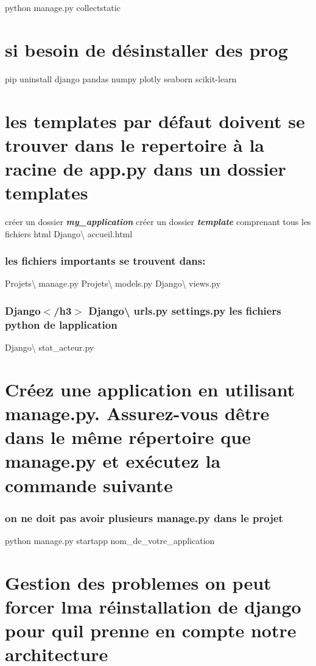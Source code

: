 python manage.\+py collectstatic

\section*{si besoin de désinstaller des prog}

pip uninstall django pandas numpy plotly seaborn scikit-\/learn

\section*{les templates par défaut doivent se trouver dans le repertoire à la racine de app.\+py dans un dossier templates}

créer un dossier {\itshape {\bfseries my\+\_\+application}} créer un dossier {\itshape {\bfseries template}} comprenant tous les fichiers html Django\textbackslash{} accueil.\+html \subsubsection*{les fichiers importants se trouvent dans\+:}

Projets\textbackslash{} manage.\+py Projets\textbackslash{} models.\+py Django\textbackslash{} views.\+py \subsubsection*{Django$<$/h3$>$ Django\textbackslash{} urls.\+py settings.\+py les fichiers python de l\textquotesingle{}application}

Django\textbackslash{} stat\+\_\+acteur.\+py

\section*{Créez une application en utilisant manage.\+py. Assurez-\/vous d\textquotesingle{}être dans le même répertoire que manage.\+py et exécutez la commande suivante}

\subsubsection*{on ne doit pas avoir plusieurs manage.\+py dans le projet}

python manage.\+py startapp nom\+\_\+de\+\_\+votre\+\_\+application

\section*{Gestion des problemes on peut forcer lma réinstallation de django pour qu\textquotesingle{}il prenne en compte notre architecture}


